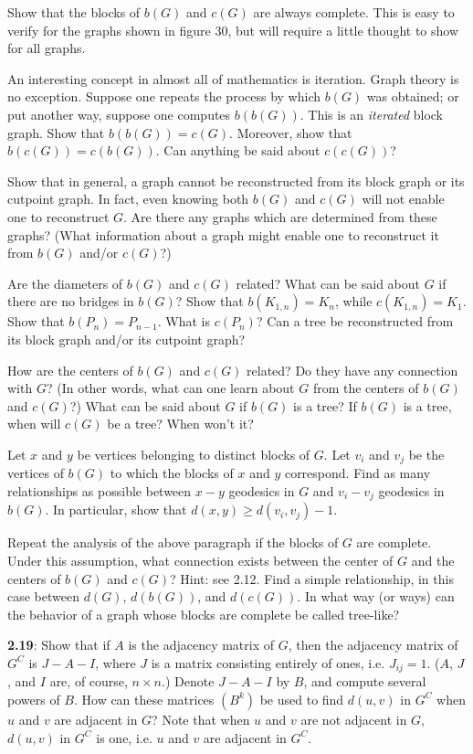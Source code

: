 \documentclass{article}
\begin{document}
Show that the blocks of $b(G)$ and $c(G)$ are always complete. This is easy to verify for the graphs shown in figure 30, but will require a little thought to show for all graphs.

An interesting concept in almost all of mathematics is iteration. Graph theory is no exception. Suppose one repeats the process by which $b(G)$ was obtained; or put another way, suppose one computes $b(b(G))$. This is an \emph{iterated} block graph. Show that $b(b(G))=c(G)$. Moreover, show that $b(c(G))=c(b(G))$. Can anything be said about $c(c(G))$?

Show that in general, a graph cannot be reconstructed from its block graph or its cutpoint graph. In fact, even knowing both $b(G)$ and $c(G)$ will not enable one to reconstruct $G$. Are there any graphs which are determined from these graphs? (What information about a graph might enable one to reconstruct it from $b(G)$ and/or $c(G)$?)

Are the diameters of $b(G)$ and $c(G)$ related? What can be said about $G$ if there are no bridges in $b(G)$? Show that $b(K_{1,n})=K_n$, while $c(K_{1,n})=K_1$. Show that $b(P_n)=P_{n-1}$. What is $c(P_n)$? Can a tree be reconstructed from its block graph and/or its cutpoint graph?

How are the centers of $b(G)$ and $c(G)$ related? Do they have any connection with $G$? (In other words, what can one learn about $G$ from the centers of $b(G)$ and $c(G)$?) What can be said about $G$ if $b(G)$ is a tree? If $b(G)$ is a tree, when will $c(G)$ be a tree? When won't it?

Let $x$ and $y$ be vertices belonging to distinct blocks of $G$. Let $v_i$ and $v_j$ be the vertices of $b(G)$ to which the blocks of $x$ and $y$ correspond. Find as many relationships as possible between $x-y$ geodesics in $G$ and $v_i-v_j$ geodesics in $b(G)$. In particular, show that $d(x,y) \geq d(v_i,v_j)-1$.

Repeat the analysis of the above paragraph if the blocks of $G$ are complete. Under this assumption, what connection exists between the center of $G$ and the centers of $b(G)$ and $c(G)$? Hint: see 2.12. Find a simple relationship, in this case between $d(G)$, $d(b(G))$, and $d(c(G))$. In what way (or ways) can the behavior of a graph whose blocks are complete be called tree-like?

\vspace{0.5cm}

\textbf{2.19}: Show that if $A$ is the adjacency matrix of $G$, then the adjacency matrix of $G^C$ is $J-A-I$, where $J$ is a matrix consisting entirely of ones, i.e. $J_{ij}=1$. ($A$, $J$, and $I$ are, of course, $n \times n$.) Denote $J-A-I$ by $B$, and compute several powers of $B$. How can these matrices $(B^k)$ be used to find $d(u,v)$ in $G^C$ when $u$ and $v$ are adjacent in $G$? Note that when $u$ and $v$ are not adjacent in $G$, $d(u,v)$ in $G^C$ is one, i.e. $u$ and $v$ are adjacent in $G^C$.
\end{document}
